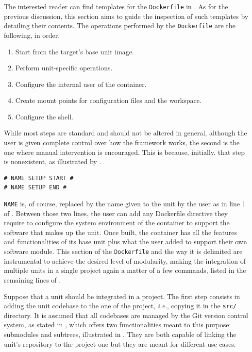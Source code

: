 The interested reader can find templates for the \texttt{Dockerfile} in \cite{masocco_dua-template_nodate}. As for the previous discussion, this section aims to guide the inspection of such templates by detailing their contents. The operations performed by the \texttt{Dockerfile} are the following, in order.
\begin{enumerate}
  \item Start from the target's base unit image.
  \item Perform unit-specific operations.
  \item Configure the internal user of the container.
  \item Create mount points for configuration files and the workspace.
  \item Configure the shell.
\end{enumerate}
While most steps are standard and should not be altered in general, although the user is given complete control over how the framework works, the second is the one where manual intervention is encouraged. This is because, initially, that step is nonexistent, as illustrated by .
\begin{center}
\begin{minipage}[t]{.9\textwidth}
\begin{lstlisting}[caption=Unit configuration step in a Dockerfile as generated by the template., label={lst:imgsetup}]
# NAME SETUP START #
# NAME SETUP END #
\end{lstlisting}
\end{minipage}
\end{center}
\texttt{NAME} is, of course, replaced by the name given to the unit by the user as in line 1 of . Between those two lines, the user can add any Dockerfile directive they require to configure the system environment of the container to support the software that makes up the unit. Once built, the container has all the features and functionalities of its base unit plus what the user added to support their own software module. This section of the \texttt{Dockerfile} and the way it is delimited are instrumental to achieve the desired level of modularity, making the integration of multiple units in a single project again a matter of a few commands, listed in the remaining lines of .

Suppose that a unit should be integrated in a project. The first step consists in adding the unit codebase to the one of the project, \emph{i.e.}, copying it in the \texttt{src/} directory. It is assumed that all codebases are managed by the Git version control system, as stated in , which offers two functionalities meant to this purpose: submodules and subtrees, illustrated in . They are both capable of linking the unit's repository to the project one but they are meant for different use cases.

